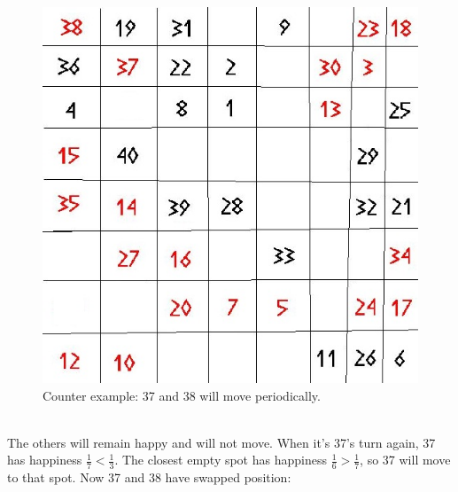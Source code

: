 \documentclass{article}
\begin{document}
\begin{figure}[!ht]
\begin{center}
\includegraphics[scale=0.25]{segregation_tegenvb_2.jpg}
\end{center}
\caption{Counter example: 37 and 38 will move periodically.}\label{counterexample2}
\end{figure}
\\The others will remain happy and will not move. When it's 37's turn again, 37 has happiness $\frac{1}{7} < \frac{1}{3}$. The closest empty spot has happiness $\frac{1}{6} > \frac{1}{7}$, so 37 will move to that spot. Now 37 and 38 have swapped position:\\
\end{document}
